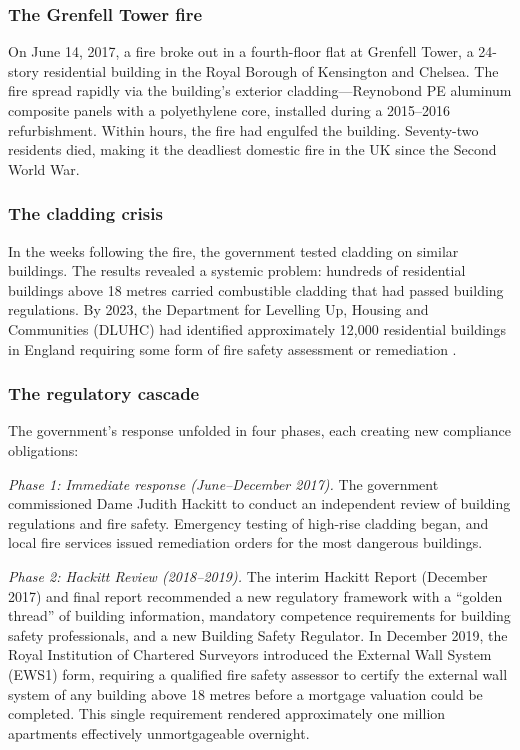 \documentclass[12pt]{article}
\begin{document}
\subsubsection*{The Grenfell Tower fire} On June 14, 2017, a fire broke out in a fourth-floor flat at Grenfell Tower, a 24-story residential building in the Royal Borough of Kensington and Chelsea. The fire spread rapidly via the building's exterior cladding---Reynobond PE aluminum composite panels with a polyethylene core, installed during a 2015--2016 refurbishment. Within hours, the fire had engulfed the building. Seventy-two residents died, making it the deadliest domestic fire in the UK since the Second World War.

\subsubsection*{The cladding crisis} In the weeks following the fire, the government tested cladding on similar buildings. The results revealed a systemic problem: hundreds of residential buildings above 18 metres carried combustible cladding that had passed building regulations. By 2023, the Department for Levelling Up, Housing and Communities (DLUHC) had identified approximately 12,000 residential buildings in England requiring some form of fire safety assessment or remediation \citep{dluhc_2023_remediation}.

\subsubsection*{The regulatory cascade} The government's response unfolded in four phases, each creating new compliance obligations:

\textit{Phase 1: Immediate response (June--December 2017).} The government commissioned Dame Judith Hackitt to conduct an independent review of building regulations and fire safety. Emergency testing of high-rise cladding began, and local fire services issued remediation orders for the most dangerous buildings.

\textit{Phase 2: Hackitt Review (2018--2019).} The interim Hackitt Report (December 2017) and final report \citep{grenfell_hackitt_2018} recommended a new regulatory framework with a ``golden thread'' of building information, mandatory competence requirements for building safety professionals, and a new Building Safety Regulator. In December 2019, the Royal Institution of Chartered Surveyors introduced the External Wall System (EWS1) form, requiring a qualified fire safety assessor to certify the external wall system of any building above 18 metres before a mortgage valuation could be completed. This single requirement rendered approximately one million apartments effectively unmortgageable overnight.
\end{document}

